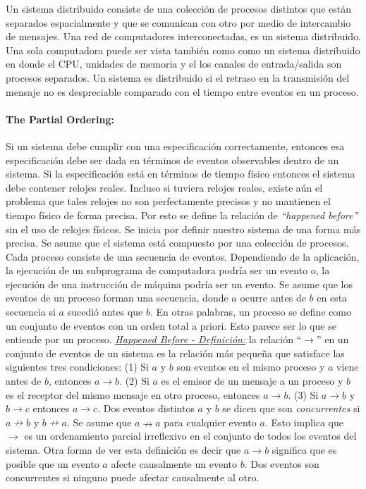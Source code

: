 Un sistema distribuido consiste de una colección de procesos distintos que están separados espacialmente y que se comunican con otro por medio de intercambio de mensajes. Una red de computadores interconectadas, es un sistema distribuido. Una sola computadora puede ser vista también como como un sistema distribuido en donde el CPU, unidades de memoria y el los canales de entrada/salida son procesos separados. Un sistema es distribuido si el retraso en la transmisión del mensaje no es despreciable comparado con el tiempo entre eventos en un proceso.

\paragraph{\textnormal{\textbf{The Partial Ordering:}}} 
Si un sistema debe cumplir con una especificación correctamente, entonces esa especificación debe ser dada en términos de eventos observables dentro de un sistema. Si la especificación está en términos de tiempo físico entonces el sistema debe contener relojes reales. Incluso si tuviera relojes reales, existe aún el problema que tales relojes no son perfectamente precisos y no mantienen el tiempo físico de forma precisa. Por esto se define la relación de \textit{``happened before''} sin el uso de relojes físicos. Se inicia por definir nuestro sistema de una forma más precisa. Se asume que el sistema está compuesto por una colección de procesos. Cada proceso consiste de una secuencia de eventos. Dependiendo de la aplicación, la ejecución de un subprograma de computadora podría ser un evento o, la ejecución de una instrucción de máquina podría ser un evento. Se asume que los eventos de un proceso forman una secuencia, donde $a$ ocurre antes de $b$ en esta secuencia si $a$ sucedió antes que $b$. En otras palabras, un proceso se define como un conjunto de eventos con un orden total a priori. Esto parece ser lo que se entiende por un proceso. \underline{\emph{Happened Before - Definición:}} la relación ``$\to$'' en un conjunto de eventos de un sistema es la relación más pequeña que satisface las siguientes tres condiciones: (1) Si $a$ y $b$ son eventos en el mismo proceso y $a$ viene antes de $b$, entonces $a \to b$. (2) Si $a$ es el emisor de un mensaje a un proceso y $b$ es el receptor del mismo mensaje en otro proceso, entonces $a \to b$. (3) Si $a \to b$ y $b \to c$ entonces $a \to c$. Dos eventos distintos $a$ y $b$ se dicen que son \emph{concurrentes} si $a \nrightarrow b$ y $b \nrightarrow a$. Se asume que $a \nrightarrow a$ para cualquier evento $a$. Esto implica que $\to$ es un ordenamiento parcial irreflexivo en el conjunto de todos los eventos del sistema. Otra forma de ver esta definición es decir que $a \to b$ significa que es posible que un evento $a$ afecte causalmente un evento $b$. Dos eventos son concurrentes si ninguno puede afectar causalmente al otro. 

